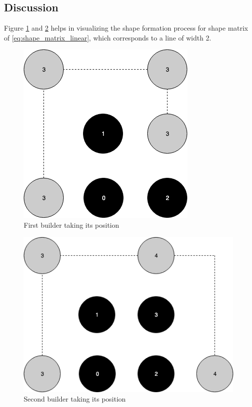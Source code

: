\documentclass{report}[12pt]
\begin{document}
\subsection{Discussion}
Figure \ref{fig:shape_formation_process_1} and \ref{fig:shape_formation_process_2} helps in visualizing the shape formation process for shape matrix of \eqref{eq:shape_matrix_linear}, which corresponds to a line of width 2.
\begin{figure}[H]
    \centering
    \includegraphics[scale=0.7]{"images/shape_formation_process_1"}
    \caption{First builder taking its position}
    \label{fig:shape_formation_process_1}
\end{figure}

\begin{figure}[H]
    \centering
    \includegraphics[scale=0.7]{"images/shape_formation_process_2"}
    \caption{Second builder taking its position}
    \label{fig:shape_formation_process_2}
\end{figure}
\end{document}
